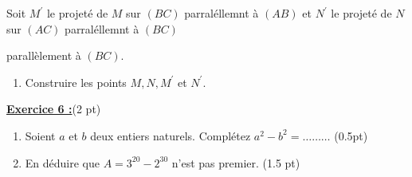 \documentclass[12pt,a4paper]{article}
\begin{document}
Soit $M^{'}$ le projeté de $M$ sur $(BC)$ parraléllemnt à $(AB)$ et  $N^{'}$ le projeté de $N$ sur $(AC)$ parraléllemnt à $(BC)$ 

parallèlement à $(BC)$.
\begin{enumerate}
    \item Construire les points $M,N,M^{'}$ et $N^{'}$.
\end{enumerate}



\underline{\large\textbf{Exercice 6 :}}(2 pt)
\begin{enumerate}
	\item Soient $a$ et $b$ deux entiers naturels. Complétez $a^2 - b^2 = \dots\dots\dots$ (0.5pt)
    \item En déduire que $A = 3^{20} - 2^{30}$ n'est pas premier. (1.5 pt)
\end{enumerate}
\end{document}
